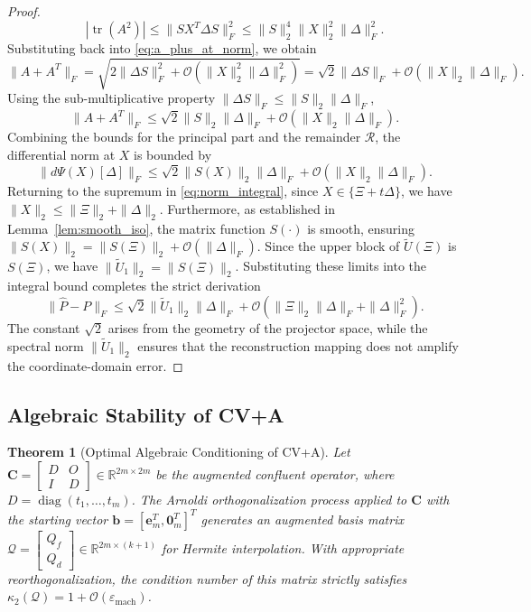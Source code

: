 \documentclass[11pt]{article}
\newtheorem{theorem}{Theorem}
\begin{document}
\begin{proof}
 $$
|\operatorname{tr}(A^2)| \leq \|S X^T \Delta S\|_F^2 \leq \|S\|_2^4 \|X\|_2^2 \|\Delta\|_F^2.
 $$
Substituting back into \eqref{eq:a_plus_at_norm}, we obtain
 $$
\|A + A^T\|_F = \sqrt{2\|\Delta S\|_F^2 + \mathcal{O}(\|X\|_2^2 \|\Delta\|_F^2)} = \sqrt{2} \|\Delta S\|_F + \mathcal{O}(\|X\|_2  \|\Delta\|_F).
 $$
Using the sub-multiplicative property $\|\Delta S\|_F \leq \|S\|_2 \|\Delta\|_F$,
 $$
\|A + A^T\|_F \leq \sqrt{2} \|S\|_2 \|\Delta\|_F + \mathcal{O}(\|X\|_2  \|\Delta\|_F).
 $$
Combining the bounds for the principal part and the remainder $\mathcal{R}$, the differential norm at $X$ is bounded by
 $$
\|d\Psi(X)[\Delta]\|_F \leq \sqrt{2} \|S(X)\|_2 \|\Delta\|_F + \mathcal{O}(\|X\|_2   \|\Delta\|_F).
 $$
Returning to the supremum in \eqref{eq:norm_integral}, since $X \in \{\Xi + t\Delta\}$, we have $\|X\|_2 \leq \|\Xi\|_2 + \|\Delta\|_2$.
Furthermore, as established in Lemma~\ref{lem:smooth_iso}, the matrix function $S(\cdot)$ is smooth, ensuring $\|S(X)\|_2 = \|S(\Xi)\|_2 + \mathcal{O}(\|\Delta\|_F)$.
Since the upper block of $\widetilde U(\Xi)$ is $S(\Xi)$, we have $\|\widetilde U_1\|_2 = \|S(\Xi)\|_2$. Substituting these limits into the integral bound completes the strict derivation
$$
\|\hat{P} - P\|_F \leq \sqrt{2} \|\widetilde U_1\|_2 \|\Delta\|_F + \mathcal{O}(\|\Xi\|_2 \|\Delta\|_F + \|\Delta\|_F^2).
$$
The constant $\sqrt{2}$ arises from the geometry of the projector space, while the spectral norm $\|\widetilde U_1\|_2$ ensures that the reconstruction mapping does not amplify the coordinate-domain error.
\end{proof}
 

\subsection{Algebraic Stability of CV+A}

\begin{theorem}[Optimal Algebraic Conditioning of CV+A] \label{thm:arnoldi_cond}
Let $\mathbf{C} = \begin{bmatrix} D & O \\ I & D \end{bmatrix} \in \mathbb{R}^{2m \times 2m}$ be the augmented confluent operator, where $D = \operatorname{diag}(t_1,\ldots,t_m)$. The Arnoldi orthogonalization process applied to $\mathbf{C}$ with the starting vector $\mathbf{b} = [\mathbf{e}_m^T, \mathbf{0}_m^T]^T$ generates an augmented basis matrix $\mathcal{Q} = \begin{bmatrix} Q_f \\ Q_d \end{bmatrix} \in \mathbb{R}^{2m \times (k+1)}$ for Hermite interpolation. With appropriate reorthogonalization, the condition number of this matrix strictly satisfies $\kappa_2(\mathcal{Q}) = 1 + \mathcal{O}(\varepsilon_{\text{mach}})$.
\end{theorem}
\end{document}
